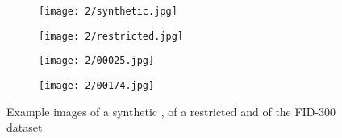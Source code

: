 \documentclass[draft,final]{vutinfth} %
\begin{document}
\begin{figure}[h]
  \centering
  \begin{subfigure}[t]{0.24\columnwidth}
    \centering
    \texttt{[image: 2/synthetic.jpg]}
    \label{fig:rw:synthetic}
  \end{subfigure}
  \begin{subfigure}[t]{0.24\columnwidth}
    \centering
    \texttt{[image: 2/restricted.jpg]}
    \label{fig:rw:restricted}
  \end{subfigure}
  \begin{subfigure}[t]{0.24\columnwidth}
    \centering
    \texttt{[image: 2/00025.jpg]}
    \label{fig:rw:highFID}
  \end{subfigure}
  \begin{subfigure}[t]{0.24\columnwidth}
    \centering
    \texttt{[image: 2/00174.jpg]}
    \label{fig:rw:lowFID}
  \end{subfigure}
  \caption{Example images of a synthetic \cite{alizadeh2017automatic}, of a restricted \cite{li2014retrieval} and of the FID-300 \cite{kortylewski2014unsupervised} dataset}
  \label{fig:rw:database}
\end{figure}
\end{document}
